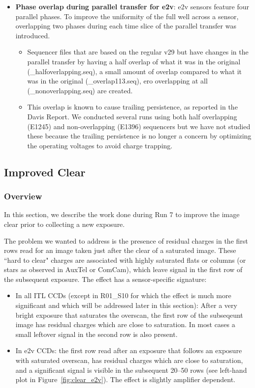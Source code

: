 \begin{itemize}
\item {\bf Phase overlap during parallel transfer for e2v}: e2v sensors feature four parallel phases. To improve the uniformity of the full well across a sensor, overlapping two phases during each time slice of the parallel transfer was introduced.
\begin{itemize}
    \item Sequencer files that are based on the regular v29 but have changes in the parallel transfer by having a half overlap of what it was in the original (\_halfoverlapping.seq), a small amount of overlap compared to what it was in the original (\_overlap113.seq), ero overlapping at all (\_nonoverlapping.seq) are created.
    \item This overlap is known to cause trailing persistence, as reported in the Davis Report. We conducted several runs using both half overlapping (E1245) and non-overlapping (E1396) sequencers but we have not studied these because the trailing persistence is no longer a concern by optimizing the operating voltages to avoid charge trapping. 
\end{itemize}


\end{itemize}

\subsection{Improved Clear}\label{sec:improved-clear}

\subsubsection{Overview}\label{overview}

In this section, we describe the work done during Run 7 to improve
the image clear prior to collecting a new exposure.

The problem we wanted to address is the presence of residual charges in
the first rows read for an image taken just after the clear of a saturated
image. These ``hard to clear" charges are associated with highly
saturated flats or columns (or stars as observed in AuxTel or ComCam),
which leave signal in the first row of the subsequent exposure. The effect has a sensor-specific signature:

\begin{itemize}
\item
  In all ITL CCDs (except in R01\_S10 for which
  the effect is much more significant and which will be addressed later
  in this section): After a very bright exposure that saturates the overscan, the first row of the subseqeunt image has residual charges which are close to saturation. In most cases a small leftover signal in the second row is also present.
\item
  In e2v CCDs: the first row read after an exposure that follows an exposure with saturated
  overscan, has residual charges which are close to saturation, and a significant signal is visible
  in the subsequent 20--50 rows (see left-hand plot in Figure~\ref{fig:clear_e2v}).
  The effect is slightly amplifier dependent.
\end{itemize}


